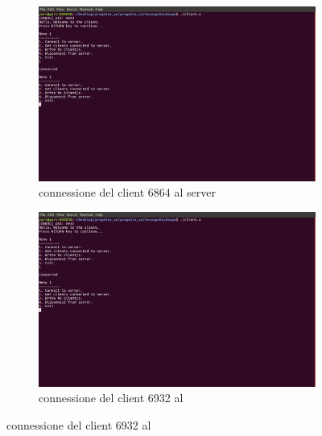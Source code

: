 \begin{figure}
\centering
\begin{subfigure}[b]{0.8\textwidth}\includegraphics[width=\textwidth]{screenmsg/3_client_6864}\caption{connessione del client 6864 al server}
\end{subfigure}

\begin{subfigure}[b]{0.8\textwidth}\includegraphics[width=\textwidth]{screenmsg/4_client_6932}
\caption{connessione del client 6932 al }
\end{subfigure}
\end{figure}

